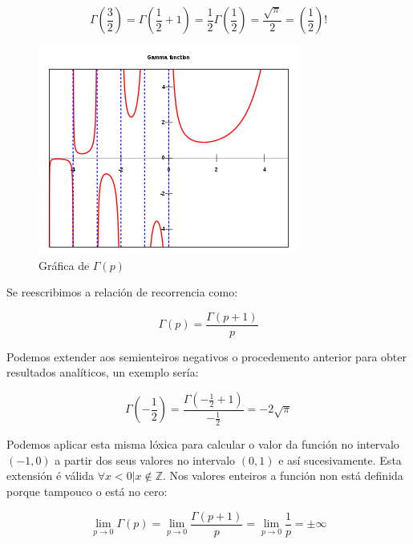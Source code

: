 \documentclass[a4paper,12pt,titlepage]{article}
\begin{document}
\begin{equation*}
    \Gamma\left (\frac{3}{2}\right ) = \Gamma \left (\frac{1}{2} + 1\right ) = \frac{1}{2} \Gamma\left (\frac{1}{2}\right ) = \frac{\sqrt{\pi}}{2} = \left (\frac{1}{2}\right )!
\end{equation*}

\begin{figure}[h!]
    \centering
    \includegraphics[width=0.85\linewidth]{Images/gammagrafica.png}
    \caption{Gráfica de $\Gamma(p)$}
\end{figure}

Se reescribimos a relación de recorrencia como:

\begin{equation*}
    \Gamma(p) = \frac{\Gamma(p+1)}{p}
\end{equation*}

Podemos extender aos semienteiros negativos o procedemento anterior para obter resultados analíticos, un exemplo sería:

\begin{equation*}
    \Gamma(-\frac{1}{2}) = \frac{\Gamma(-\frac{1}{2}+1)}{-\frac{1}{2}} = -2\sqrt{\pi}
\end{equation*}

Podemos aplicar esta misma lóxica para calcular o valor da función no intervalo $(-1,0)$ a partir dos seus valores no intervalo $(0,1)$ e así sucesivamente. Esta extensión é válida $\forall x <0 | x\notin \mathbb{Z}$. Nos valores enteiros a función non está definida porque tampouco o está no cero:

\begin{equation*}
    \lim_{p\to0} \Gamma(p) = \lim_{p\to 0} \frac{\Gamma(p+1)}{p} =\lim_{p\to0} \frac{1}{p} = \pm \infty
\end{equation*}
\end{document}
